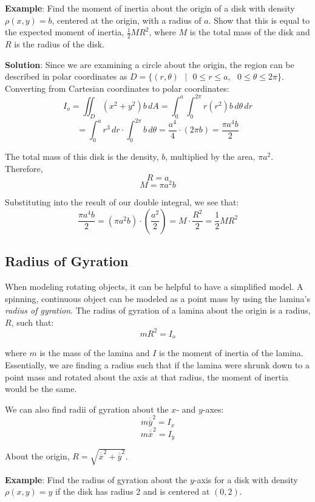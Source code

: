\textbf{Example}: Find the moment of inertia about the origin of a disk with 
density $\rho(x, y) = b$, centered at the origin, with a radius of $a$. Show that 
this is equal to the expected moment of inertia, $\frac{1}{2}MR^2$, where $M$ 
is the total mass of the disk and $R$ is the radius of the disk.

\textbf{Solution}: Since we are examining a circle about the origin, the 
region can be described in polar coordinates as $\textit{D} = \{(r, \theta)
\text{ }|\text{ } 0 \leq r \leq a, \text{ }0 \leq \theta \leq 2\pi \}$. 
Converting from Cartesian coordinates to polar coordinates:
$$I_o = \iint_{\textit{D}} \left(x ^2 + y^2 \right) b\,dA = \int_0^a \int_0^{2
\pi} r \left( r^2 \right) b\,d\theta \,d r$$
$$= \int_0^a r^3\,dr \cdot \int_0^{2\pi}b \,d\theta = \frac{a^4}{4} \cdot 
\left(2\pi b \right) = \frac{\pi a^4 b}{2}$$

The total mass of this disk is the density, $b$, multiplied by the area, $\pi 
a^2$. Therefore,
$$R = a$$
$$M = \pi a^2 b$$

Substituting into the result of our double integral, we see that:
$$\frac{\pi a^4 b}{2} = \left( \pi a^2 b \right) \cdot \left( \frac{a^2}{2} 
\right) = M \cdot \frac{R^2}{2} = \frac{1}{2}MR^2$$

\subsection{Radius of Gyration}
When modeling rotating objects, it can be helpful to have a simplified model. 
A spinning, continuous object can be modeled as a point mass by using the 
lamina's \textit{radius of gyration}. The radius of 
gyration of a lamina about the origin is a radius, $R$, such that:
$$mR^2 = I_o$$

where $m$ is the mass of the lamina and $I$ is the moment of inertia of the 
lamina. Essentially, we are finding a radius such that if the lamina were 
shrunk down to a point mass and rotated about the axis at that radius, the 
moment of inertia would be the same. 

We can also find radii of gyration about the $x$- and $y$-axes:
$$m \overline{\overline{y}}^2 = I_{x}$$
$$m \overline{\overline{x}}^2 = I_{y}$$

About the origin, $R = \sqrt{ \overline{\overline{x}}^2 + \overline{\overline{y}}^2}$. 

\textbf{Example}: Find the radius of gyration about the $y$-axis for a disk 
with density $\rho(x, y) = y$ if the disk has radius 2 and is centered at $(0, 
2)$. 

